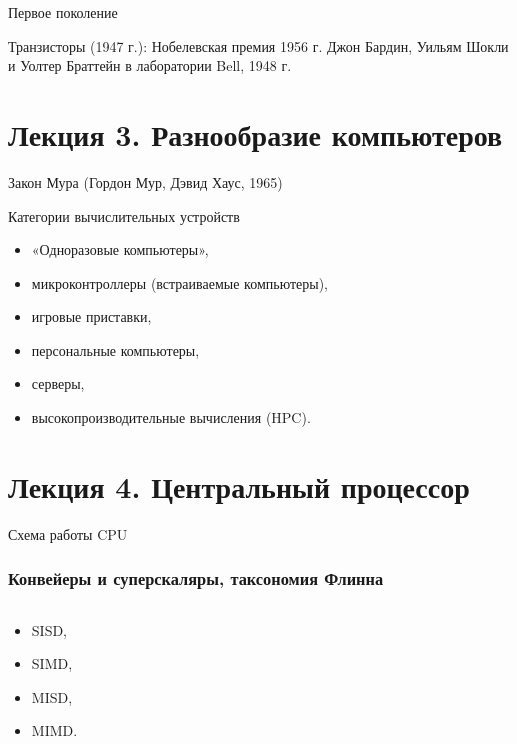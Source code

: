 \begin{frame}{Первое поколение}
\end{frame}

\begin{frame}{Транзисторы (1947 г.): Нобелевская премия 1956 г.}
\vspace{-.3cm}\small Джон Бардин, Уильям Шокли и Уолтер Браттейн в лаборатории Bell, 1948 г.
\end{frame}

\section[{Лекция 3. Разнообразие компьютеров}]{Лекция 3. Разнообразие компьютеров}

\begin{frame}[plain]{Закон Мура (Гордон Мур, Дэвид Хаус, 1965)}
\vspace{-.2cm}
\end{frame}

\begin{frame}{Категории вычислительных устройств}
\begin{itemize}
    \item «Одноразовые компьютеры»,
    \item микроконтроллеры (встраиваемые компьютеры),
    \item игровые приставки,
    \item персональные компьютеры,
    \item серверы,
    \item высокопроизводительные вычисления (HPC).
\end{itemize}
\end{frame}

\section{Лекция 4. Центральный процессор}
\begin{frame}{Схема работы CPU}
\color{red}{Красным} \color{black}{— поток управления, чёрным — поток данных.}
\end{frame}

\begin{frame}
\frametitle{Конвейеры и суперскаляры, таксономия Флинна}
\begin{columns}
    \column{5cm}
\vspace{-1.8cm}
\vspace{-.5cm}
    \column{6cm}
\vspace{.2cm}
\end{columns}
\begin{itemize}
    \item SISD,
    \item SIMD,
    \item MISD,
    \item MIMD.
\end{itemize}
\end{frame}

